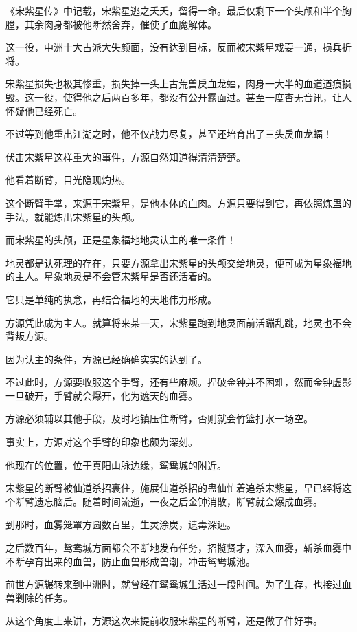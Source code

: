 \begin{this_body}
《宋紫星传》中记载，宋紫星逃之夭夭，留得一命。最后仅剩下一个头颅和半个胸膛，其余肉身都被他断然舍弃，催使了血魔解体。

这一役，中洲十大古派大失颜面，没有达到目标，反而被宋紫星戏耍一通，损兵折将。

宋紫星损失也极其惨重，损失掉一头上古荒兽戾血龙蝠，肉身一大半的血道道痕损毁。这一役，使得他之后两百多年，都没有公开露面过。甚至一度杳无音讯，让人怀疑他已经死亡。

不过等到他重出江湖之时，他不仅战力尽复，甚至还培育出了三头戾血龙蝠！

伏击宋紫星这样重大的事件，方源自然知道得清清楚楚。

他看着断臂，目光隐现灼热。

这个断臂手掌，来源于宋紫星，是他本体的血肉。方源只要得到它，再依照炼蛊的手法，就能炼出宋紫星的头颅。

而宋紫星的头颅，正是星象福地地灵认主的唯一条件！

地灵都是认死理的存在，只要方源拿出宋紫星的头颅交给地灵，便可成为星象福地的主人。星象地灵是不会管宋紫星是否还活着的。

它只是单纯的执念，再结合福地的天地伟力形成。

方源凭此成为主人。就算将来某一天，宋紫星跑到地灵面前活蹦乱跳，地灵也不会背叛方源。

因为认主的条件，方源已经确确实实的达到了。

不过此时，方源要收服这个手臂，还有些麻烦。捏破金钟并不困难，然而金钟虚影一旦破开，手臂就会爆开，化为遮天的血雾。

方源必须辅以其他手段，及时地镇压住断臂，否则就会竹篮打水一场空。

事实上，方源对这个手臂的印象也颇为深刻。

他现在的位置，位于真阳山脉边缘，鸳鸯城的附近。

宋紫星的断臂被仙道杀招裹住，施展仙道杀招的蛊仙忙着追杀宋紫星，早已经将这个断臂遗忘脑后。随着时间流逝，一夜之后金钟消散，断臂就会爆成血雾。

到那时，血雾笼罩方圆数百里，生灵涂炭，遗毒深远。

之后数百年，鸳鸯城方面都会不断地发布任务，招揽贤才，深入血雾，斩杀血雾中不断孕育出来的血兽，防止血兽形成兽潮，冲击鸳鸯城池。

前世方源辗转来到中洲时，就曾经在鸳鸯城生活过一段时间。为了生存，也接过血兽剿除的任务。

从这个角度上来讲，方源这次来提前收服宋紫星的断臂，还是做了件好事。


\end{this_body}

